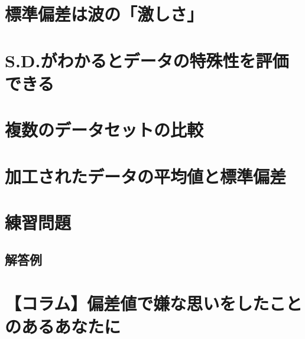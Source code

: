 \documentclass[
  12pt,
]{book}
\begin{document}
\hypertarget{ux6a19ux6e96ux504fux5deeux306fux6ce2ux306eux6fc0ux3057ux3055}{%
\section{標準偏差は波の「激しさ」}\label{ux6a19ux6e96ux504fux5deeux306fux6ce2ux306eux6fc0ux3057ux3055}}

\hypertarget{s.d.ux304cux308fux304bux308bux3068ux30c7ux30fcux30bfux306eux7279ux6b8aux6027ux3092ux8a55ux4fa1ux3067ux304dux308b}{%
\section{S.D.がわかるとデータの特殊性を評価できる}\label{s.d.ux304cux308fux304bux308bux3068ux30c7ux30fcux30bfux306eux7279ux6b8aux6027ux3092ux8a55ux4fa1ux3067ux304dux308b}}

\hypertarget{ux8907ux6570ux306eux30c7ux30fcux30bfux30bbux30c3ux30c8ux306eux6bd4ux8f03}{%
\section{複数のデータセットの比較}\label{ux8907ux6570ux306eux30c7ux30fcux30bfux30bbux30c3ux30c8ux306eux6bd4ux8f03}}

\hypertarget{ux52a0ux5de5ux3055ux308cux305fux30c7ux30fcux30bfux306eux5e73ux5747ux5024ux3068ux6a19ux6e96ux504fux5dee}{%
\section{加工されたデータの平均値と標準偏差}\label{ux52a0ux5de5ux3055ux308cux305fux30c7ux30fcux30bfux306eux5e73ux5747ux5024ux3068ux6a19ux6e96ux504fux5dee}}

\hypertarget{ux7df4ux7fd2ux554fux984c-3}{%
\section*{練習問題}\label{ux7df4ux7fd2ux554fux984c-3}}

\hypertarget{ux89e3ux7b54ux4f8b-4}{%
\subsection*{解答例}\label{ux89e3ux7b54ux4f8b-4}}

\hypertarget{ux30b3ux30e9ux30e0ux504fux5deeux5024ux3067ux5accux306aux601dux3044ux3092ux3057ux305fux3053ux3068ux306eux3042ux308bux3042ux306aux305fux306b}{%
\section*{【コラム】偏差値で嫌な思いをしたことのあるあなたに}\label{ux30b3ux30e9ux30e0ux504fux5deeux5024ux3067ux5accux306aux601dux3044ux3092ux3057ux305fux3053ux3068ux306eux3042ux308bux3042ux306aux305fux306b}}
\end{document}
